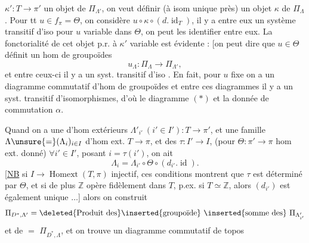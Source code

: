  \(\kappa':T\longrightarrow\pi'\) un objet de \(\Pi_{\Lambda'}\),
on veut définir (à isom unique près) un
objet \(\kappa\) de \(\Pi_\Lambda\). Pour tt \(u\in f_\pi=\Theta\),
on considère \(u\circ\kappa\circ(d.\operatorname{id}_T)\), il y a entre eux
un système transitif d'iso pour \(u\) variable
dans \(\Theta\), on peut les identifier entre eux.
La fonctorialité de cet objet p.r. à
\(\kappa'\) variable est évidente : [on peut dire que
\(u\in\Theta\) définit un hom de groupoïdes
\[
u_\Lambda:\Pi_\Lambda\longrightarrow\Pi_{\Lambda'},
\]
et entre ceux-ci
il y a un syst. transitif d'iso \unsure{\}}. En fait,
pour \(u\) fixe on a un  diagramme
commutatif d'hom de groupoïdes
et entre ces diagrammes il y a un
syst. transitif d'isomorphismes, d'où
le diagramme \((*)\) et la donnée
de commutation \(\alpha\).

Quand on a une   d'hom
extérieurs \(\Lambda'_{i'}\ (i'\in I'):T\longrightarrow\pi'\), et une
famille \(\Lambda\unsure{=}(\Lambda_i)_{i\in I}\) d'hom ext. \(T\longrightarrow\pi\), et des
\(\tau:I'\longrightarrow I\), 
(pour \(\Theta:\pi'\longrightarrow\pi\) hom ext. donné)
\(\forall i'\in I'\), posant \(i=\tau(i')\), on ait
\[
\Lambda_i=\Lambda_{i'}\circ\Theta\circ(d_{i'}.\operatorname{id}).
\]
[\uline{NB} si \(I\longrightarrow\operatorname{Homext}(T,\pi)\) injectif, ces conditions
montrent que \(\tau\) est déterminé par \(\Theta\), et si
de plus \(\mathbb Z\) opère fidèlement dans \(T\), p.ex.
si \(T\simeq\mathbb Z\), alors \((d_{i'})\) est également unique \(\ldots\)]
alors on construit 
\[
\Pi_{D^*,\Lambda'}=
\deleted{\text{Produit des}}\inserted{\text{groupoïde}}\ \inserted{\text{somme des}}\ \Pi_{\Lambda'_{i'}}
\]
et de \(=\) \(\Pi_{D^*,\Lambda}\), et on trouve un
diagramme commutatif de topos

